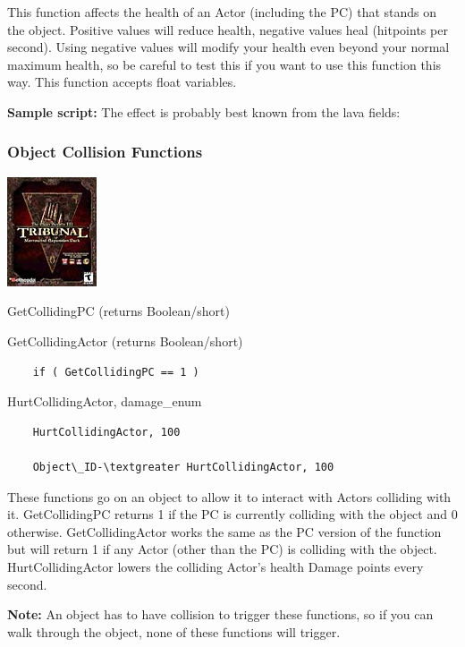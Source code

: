 This function affects the health of an Actor (including the PC) that
stands on the object. Positive values will reduce health, negative
values heal (hitpoints per second). Using negative values will modify
your health even beyond your normal maximum health, so be careful to
test this if you want to use this function this way. This function
accepts float variables.

\textbf{Sample script:} The effect is probably best known from the lava
fields:



\hypertarget{object-collision-functions}{%
\subsubsection{Object Collision
Functions}\label{object-collision-functions}}

\includegraphics{media/image6.png}

GetCollidingPC (returns Boolean/short)

GetCollidingActor (returns Boolean/short)

\begin{lstlisting}
	if ( GetCollidingPC == 1 )
\end{lstlisting}

HurtCollidingActor, damage\_enum

\begin{lstlisting}
	HurtCollidingActor, 100
	
	Object\_ID-\textgreater HurtCollidingActor, 100
\end{lstlisting}

These functions go on an object to allow it to interact with Actors
colliding with it. GetCollidingPC returns 1 if the PC is currently
colliding with the object and 0 otherwise. GetCollidingActor works the
same as the PC version of the function but will return 1 if any Actor
(other than the PC) is colliding with the object. HurtCollidingActor
lowers the colliding Actor's health Damage points every second.

\textbf{Note:} An object has to have collision to trigger these
functions, so if you can walk through the object, none of these
functions will trigger.

